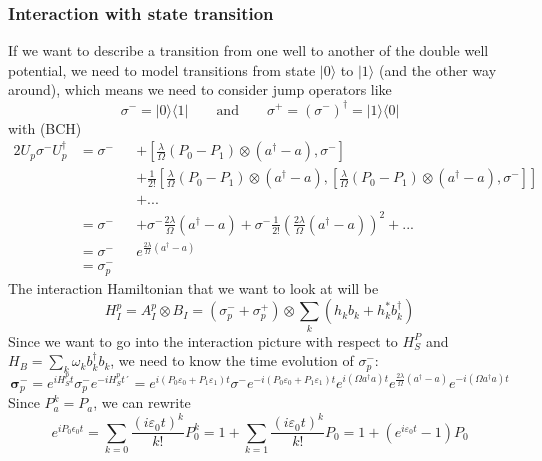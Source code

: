	\subsubsection{Interaction with state transition}
	If we want to describe a transition from one well to another of the double well potential, we need to model transitions from state $|0\rangle$ to $|1\rangle$ (and the other way around), which means we need to consider jump operators like
	\begin{equation}
		\sigma^- =	|0\rangle \langle 1| \qquad \text{and} \qquad \sigma^+ =	(\sigma^-)^\dagger =	|1\rangle\langle 0 |
	\end{equation}
	with (BCH)
	\begin{alignat*}{2}
		U_p \sigma^- U_p^\dagger &=	\sigma^- &&+ \left[\frac{\lambda}{\Omega} (P_0 - P_1) \otimes (a^\dagger - a), \sigma^-\right] \\
		& &&+	\frac{1}{2!} \left[\frac{\lambda}{\Omega} (P_0 - P_1) \otimes (a^\dagger - a) , \left[\frac{\lambda}{\Omega} (P_0 - P_1) \otimes (a^\dagger - a), \sigma^-\right]\right] \\
		& &&+ ...  \\
		&= \sigma^- &&+ \sigma^- \frac{2 \lambda}{\Omega} (a^\dagger - a) + \sigma^- \frac{1}{2!} \left(\frac{2 \lambda}{\Omega} (a^\dagger - a)\right)^2 + ... \\
		&= \sigma^- && e^{\frac{2\lambda}{\Omega} (a^\dagger -a)} \\
		& =	\sigma_p^{-}
	\end{alignat*}
	The interaction Hamiltonian that we want to look at will be
	\begin{equation}
		H_I^p =	A_I^p \otimes B_I =	(\sigma_p^- + \sigma_p^+) \otimes \sum_k (h_k b_k + h_k^* b_k^\dagger)
	\end{equation}
	Since we want to go into the interaction picture with respect to $H_S^P$ and $H_B =	\sum_k \omega_k b_k^\dagger b_k$, we need to know the time evolution of $\sigma_p^-$:
	\begin{equation}
		\boldsymbol{\sigma}_p^- =	e^{iH_S^pt} \sigma_p^- e^{-iH_S^p t´} =	e^{i (P_0 \varepsilon_0 + P_1 \varepsilon_1)t} \sigma^- e^{-i (P_0 \varepsilon_0 + P_1 \varepsilon_1)t} e^{i (\Omega a^\dagger a)t}e^{\frac{2\lambda}{\Omega} (a^\dagger -a)}  e^{-i (\Omega a^\dagger a)t}
	\end{equation}
	Since $P_a^k =	P_a$, we can rewrite
	\begin{equation}
		e^{iP_0\epsilon_0t} =	\sum_{k=0} \frac{(i\varepsilon_0 t)^k}{k!} P_0^k =	1 + \sum_{k=1} \frac{(i\varepsilon_0 t)^k}{k!} P_0 =	1 + (e^{i\varepsilon_0 t} - 1) P_0
	\end{equation}
